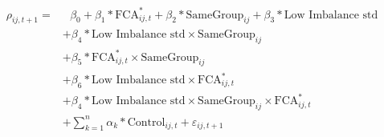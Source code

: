 \textsl{}\begin{equation}
\begin{split}
\rho_{ij,t+1} = & \text{ 	}\beta_0 + \beta_1* \text{FCA}^*_{ij,t} + \beta_2* \text{SameGroup}_{ij} + \beta_3 * \text{Low Imbalance std} \\
& +\beta_4* \text{Low Imbalance std} \times \text{SameGroup}_{ij}  \\
& +\beta_5* \text{FCA}^*_{ij,t} \times \text{SameGroup}_{ij}  \\
& +\beta_6* \text{Low Imbalance std} \times \text{FCA}^*_{ij,t}  \\
 & 	+\beta_4* \text{Low Imbalance std} \times \text{SameGroup}_{ij} \times \text{FCA}^*_{ij,t}   \\
  & + \sum_{k=1} ^{n} \alpha_k*\text{Control}_{ij,t} + \varepsilon_{ij,t+1}
\end{split}
\label{model1}
\end{equation}